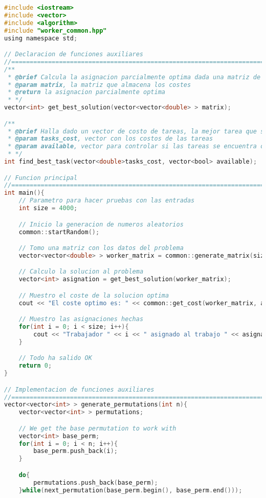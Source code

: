 \documentclass[10pt, a4paper]{article}
\theoremstyle{theorem-style}
\theoremstyle{theorem-style}
\theoremstyle{definition-style}
\theoremstyle{remark-style}
\theoremstyle{example-style}
\theoremstyle{definition-style}
\theoremstyle{remark-style}
\begin{document}
\begin{lstlisting}[language=C]
#include <iostream>
#include <vector>
#include <algorithm>
#include "worker_common.hpp"
using namespace std;

// Declaracion de funciones auxiliares
//==============================================================================
/**
 * @brief Calcula la asignacion parcialmente optima dada una matriz de costes, usando un algoritmo greedy
 * @param matrix, la matriz que almacena los costes
 * @return la asignacion parcialmente optima
 * */
vector<int> get_best_solution(vector<vector<double> > matrix);

/**
 * @brief Halla dado un vector de costo de tareas, la mejor tarea que se encuentra disponible
 * @param tasks_cost, vector con los costos de las tareas
 * @param available, vector para controlar si las tareas se encuentra o no disponibles
 * */
int find_best_task(vector<double>tasks_cost, vector<bool> available);

// Funcion principal
//==============================================================================
int main(){
    // Parametro para hacer pruebas con las entradas
    int size = 4000;

    // Inicio la generacion de numeros aleatorios
    common::startRandom();

    // Tomo una matriz con los datos del problema
    vector<vector<double> > worker_matrix = common::generate_matrix(size);

    // Calculo la solucion al problema
    vector<int> asignation = get_best_solution(worker_matrix);

    // Muestro el coste de la solucion optima
    cout << "El coste optimo es: " << common::get_cost(worker_matrix, asignation) << endl;

    // Muestro las asignaciones hechas
    for(int i = 0; i < size; i++){
        cout << "Trabajador " << i << " asignado al trabajo " << asignation[i] << endl;
    }

    // Todo ha salido OK
    return 0;
}

// Implementacion de funciones auxiliares
//==============================================================================
vector<vector<int> > generate_permutations(int n){
    vector<vector<int> > permutations;

    // We get the base permutation to work with
    vector<int> base_perm;
    for(int i = 0; i < n; i++){
        base_perm.push_back(i);
    }

    do{
        permutations.push_back(base_perm);
    }while(next_permutation(base_perm.begin(), base_perm.end()));



\end{lstlisting}
\end{document}
